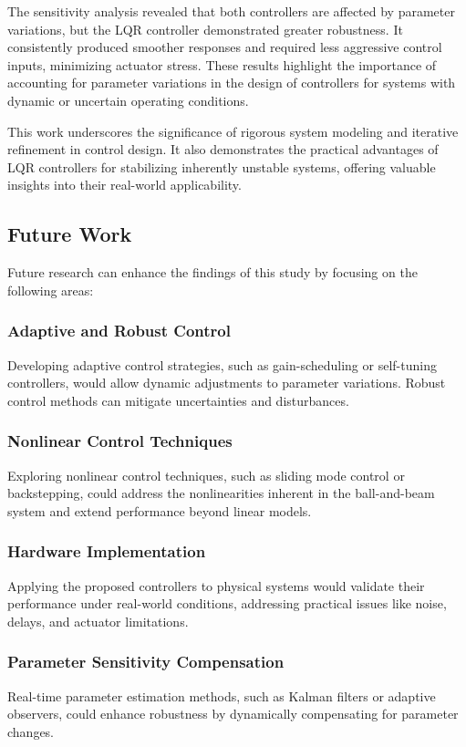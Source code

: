 \documentclass[conference]{IEEEtran}
\begin{document}
The sensitivity analysis revealed that both controllers are affected by parameter variations, but the LQR controller demonstrated greater robustness. It consistently produced smoother responses and required less aggressive control inputs, minimizing actuator stress. These results highlight the importance of accounting for parameter variations in the design of controllers for systems with dynamic or uncertain operating conditions.

This work underscores the significance of rigorous system modeling and iterative refinement in control design. It also demonstrates the practical advantages of LQR controllers for stabilizing inherently unstable systems, offering valuable insights into their real-world applicability.

\subsection{Future Work}
Future research can enhance the findings of this study by focusing on the following areas:

\subsubsection{Adaptive and Robust Control}
Developing adaptive control strategies, such as gain-scheduling or self-tuning controllers, would allow dynamic adjustments to parameter variations. Robust control methods can mitigate uncertainties and disturbances.

\subsubsection{Nonlinear Control Techniques}
Exploring nonlinear control techniques, such as sliding mode control or backstepping, could address the nonlinearities inherent in the ball-and-beam system and extend performance beyond linear models.

\subsubsection{Hardware Implementation}
Applying the proposed controllers to physical systems would validate their performance under real-world conditions, addressing practical issues like noise, delays, and actuator limitations.

\subsubsection{Parameter Sensitivity Compensation}
Real-time parameter estimation methods, such as Kalman filters or adaptive observers, could enhance robustness by dynamically compensating for parameter changes.
\end{document}
